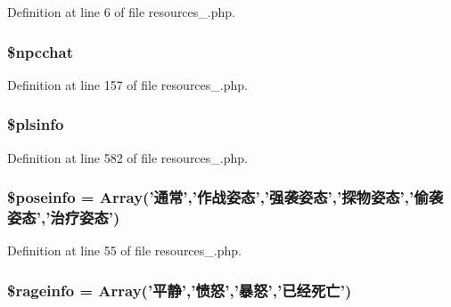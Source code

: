 Definition at line 6 of file resources\+\_.\+php.

\hypertarget{resources__1_8php_a413262abf345c0466e9927a412571365}{
\subsubsection[{\$npcchat}]{\setlength{\rightskip}{0pt plus 5cm}\$npcchat}}\label{resources__1_8php_a413262abf345c0466e9927a412571365}


Definition at line 157 of file resources\+\_.\+php.

\hypertarget{resources__1_8php_a80fc03ebf0cae6b56b4e8f4738273199}{
\subsubsection[{\$plsinfo}]{\setlength{\rightskip}{0pt plus 5cm}\$plsinfo}}\label{resources__1_8php_a80fc03ebf0cae6b56b4e8f4738273199}


Definition at line 582 of file resources\+\_.\+php.

\hypertarget{resources__1_8php_af6cbbc5cff2f1db3093587d7495600ae}{
\subsubsection[{\$poseinfo}]{\setlength{\rightskip}{0pt plus 5cm}\$poseinfo = Array('通常','作战姿态','强袭姿态','探物姿态','偷袭姿态','治疗姿态')}}\label{resources__1_8php_af6cbbc5cff2f1db3093587d7495600ae}


Definition at line 55 of file resources\+\_.\+php.

\hypertarget{resources__1_8php_a5f383706ecfe4033fc5ba410b5efe3a0}{
\subsubsection[{\$rageinfo}]{\setlength{\rightskip}{0pt plus 5cm}\$rageinfo = Array('平静','愤怒','暴怒','已经死亡')}}\label{resources__1_8php_a5f383706ecfe4033fc5ba410b5efe3a0}


